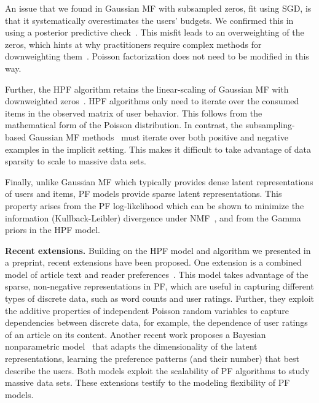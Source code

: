 An issue that we found in Gaussian MF with subsampled zeros, fit using
SGD, is that it systematically overestimates the users' budgets. We
confirmed this in  using a posterior predictive
check~\cite{Gelman:1996}. This misfit leads to an overweighting of the
zeros, which hints at why practitioners require complex methods for
downweighting
them~\cite{Dror:2012a,Gantner:2012p9364,Hu:2008p9402,Paquet:2013p9197}.
Poisson factorization does not need to be modified in this way.


Further, the HPF algorithm retains the linear-scaling of Gaussian MF
with downweighted zeros~\cite{Hu:2008p9402}. HPF algorithms only need
to iterate over the consumed items in the observed matrix of user
behavior. This follows from the mathematical form of the Poisson
distribution.  In contrast, the subsampling-based Gaussian MF
methods~\cite{Dror:2012a,Gantner:2012p9364,Paquet:2013p9197} must
iterate over both positive and negative examples in the implicit
setting. This makes it difficult to take advantage of data sparsity to
scale to massive data sets.

Finally, unlike Gaussian MF which typically provides dense latent
representations of users and items, PF models provide sparse latent
representations. This property arises from the PF log-likelihood which
can be shown to minimize the information (Kullback-Leibler) divergence
under NMF~\cite{Cemgil:2009}, and from the Gamma priors in the HPF model.

{\bf Recent extensions.}
Building on the HPF model and algorithm we presented in a preprint,
recent extensions have been proposed. One extension is a combined model of article text and
reader preferences~\cite{gopalan2014content}. This model takes
advantage of the sparse, non-negative representations in PF, which are
useful in capturing different types of discrete data, such as word
counts and user ratings. Further, they exploit the additive properties
of independent Poisson random variables to capture dependencies
between discrete data, for example, the dependence of user ratings of
an article on its content. Another recent work proposes a Bayesian
nonparametric model~\cite{gopalan2014bayesian} that adapts the
dimensionality of the latent representations, learning the preference
patterns (and their number) that best describe the users. Both models
exploit the scalability of PF algorithms to study massive data sets.
These extensions testify to the modeling flexibility of PF models.
